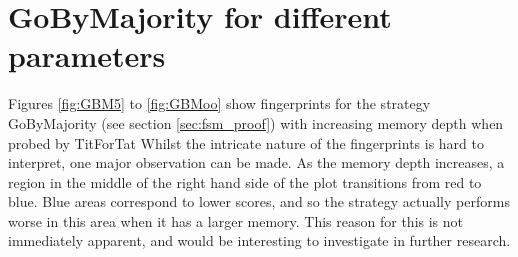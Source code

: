

\section{GoByMajority for different parameters}\label{sec:GBM}

Figures \ref{fig:GBM5} to \ref{fig:GBMoo} show fingerprints for the strategy GoByMajority (see section \ref{sec:fsm_proof}) with increasing memory depth when probed by TitForTat
Whilst the intricate nature of the fingerprints is hard to interpret, one major observation can be made.
As the memory depth increases, a region in the middle of the right hand side of the plot transitions from red to blue.
Blue areas correspond to lower scores, and so the strategy actually performs worse in this area when it has a larger memory.
This reason for this is not immediately apparent, and would be interesting to investigate in further research.

